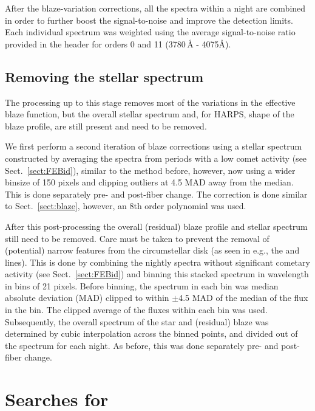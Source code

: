 \documentclass{aa}
\begin{document}
After the blaze-variation corrections, all the spectra within a night are combined in order to further boost the signal-to-noise and improve the detection limits.
%
Each individual spectrum was weighted using the average signal-to-noise ratio provided in the header for orders 0 and 11 (3780\,\AA{} - 4075\AA).

\subsection{Removing the stellar spectrum}\label{sect:starcor}

The processing up to this stage removes most of the variations in the effective blaze function, but the overall stellar spectrum and, for HARPS, shape of the blaze profile, are still present and need to be removed. 

We first perform a second iteration of blaze corrections using a stellar spectrum constructed by averaging the spectra from periods with a low comet activity (see Sect.~\ref{sect:FEBid}), similar to the method before, however, now using a wider binsize of 150 pixels and clipping outliers at 4.5 MAD away from the median.
%
This is done separately pre- and post-fiber change. The correction is done similar to Sect.~\ref{sect:blaze}, however, an 8th order polynomial was used.

After this post-processing the overall (residual) blaze profile and stellar spectrum still need to be removed.
%
Care must be taken to prevent the removal of (potential) narrow features from the circumstellar disk (as seen in e.g., the  and  lines).
%
This is done by combining the nightly spectra without significant cometary activity (see Sect.~\ref{sect:FEBid}) and binning this stacked spectrum in wavelength in bins of 21 pixels.
%
Before binning, the spectrum in each bin was median absolute deviation (MAD) clipped to within $\pm$4.5 MAD of the median of the flux in the bin.
%
The clipped average of the fluxes within each bin was used.
%
Subsequently, the overall spectrum of the star and (residual) blaze was determined by cubic interpolation across the binned points, and divided out of the spectrum for each night.
%
As before, this was done separately pre- and post-fiber change.

\section{Searches for \texorpdfstring{}{CN}}\label{sect:CNsearch}
\end{document}
